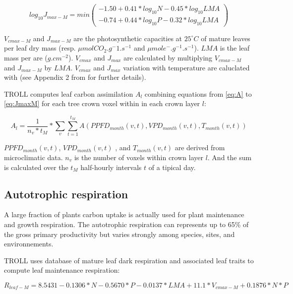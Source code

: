 \documentclass[12pt,]{article}
\theoremstyle{definition}
\theoremstyle{definition}
\theoremstyle{remark}
\begin{document}
\begin{equation}
  log_{10} J_{max-M} = min(
  \begin{array}{c} 
    -1.50+0.41*log_{10} N-0.45*log_{10} LMA \\
    -0.74+0.44*log_{10} P-0.32*log_{10} LMA 
  \end{array}
  )
  \label{eq:JmaxM}
\end{equation}

\(V_{cmax-M}\) and \(J_{max-M}\) are the photosynthetic capacities at
\(25^\circ C\) of mature leaves per leaf dry mass (resp.
\(\mu mol CO_2.g^-1.s^{-1}\) and \(\mu mol e^-.g^{-1}.s^{-1}\)). \(LMA\)
is the leaf mass per are (\(g.cm^{-2}\)). \(V_{cmax}\) and \(J_{max}\)
are calculated by multiplying \(V_{cmax-M}\) and \(J_{max-M}\) by
\(LMA\). \(V_{cmax}\) and \(J_{max}\) variation with temperature are
caluclated with \citet{Bernacchi2003} (see Appendix 2 from \citet{Li}
for further details).

TROLL computes leaf carbon assimilation \(A_l\) combining equations from
\eqref{eq:A} to \eqref{eq:JmaxM} for each tree crown voxel within in each
crown layer \(l\):

\begin{equation}
  A_l = \frac{1}{n_v*t_M} * \sum_v  \sum^{t_M}_{t=1} A(PPFD_{month}(v,t),VPD_{month}(v,t),T_{month}(v,t))
  \label{eq:Al}
\end{equation}

\(PPFD_{month}(v,t)\), \(VPD_{month}(v,t)\) , and \(T_{month}(v,t)\) are
derived from microclimatic data. \(n_v\) is the number of voxels within
crown layer \(l\). And the sum is calculated over the \(t_M\)
half-hourly intervals \(t\) of a tipical day.

\subsection{Autotrophic respiration}\label{autotrophic-respiration}

A large fraction of plants carbon uptake is actually used for plant
maintenance and growth respiration. The autotrophic respiration can
represents up to 65\% of the gross primary productivity but varies
strongly among species, sites, and environnements.

TROLL uses \citet{Atkin2015} database of mature leaf dark respiration
and associated leaf traits to compute leaf maintenance respiration:

\begin{equation}
  R_{leaf-M} = 8.5431-0.1306*N-0.5670*P-0.0137*LMA+11.1*V_{cmax-M}+0.1876*N*P
  \label{eq:Rl}
\end{equation}
\end{document}

